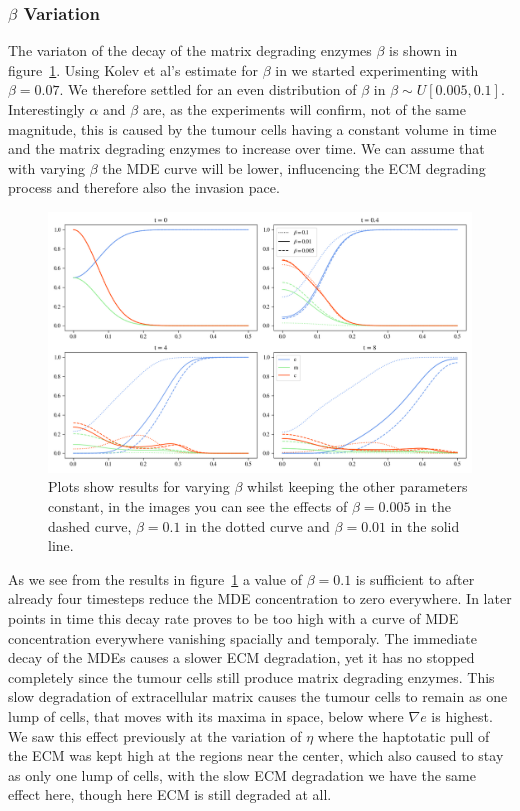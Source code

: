 \subsubsection*{$\beta$ Variation}
The variaton of the decay of the matrix degrading enzymes $\beta$ is shown in figure~\ref{fig:beta_variation}. Using Kolev et al's estimate for $\beta$ in \cite{Kolev2010} we started experimenting with $\beta=0.07$. We therefore settled for an even distribution of $\beta$ in $\beta \sim U[0.005, 0.1]$. Interestingly $\alpha$ and $\beta$ are, as the experiments will confirm, not of the same magnitude, this is caused by the tumour cells having a constant volume in time and the matrix degrading enzymes to increase over time. We can assume that with varying $\beta$ the MDE curve will be lower, influcencing the ECM degrading process and therefore also the invasion pace. \newline 
\begin{figure}[h]
    \centering
    \includegraphics[width=\textwidth]{resources/images/beta_variation.png}
    \caption{Plots show results for varying $\beta$ whilst keeping the other parameters constant, in the images you can see the effects of $\beta=0.005$ in the dashed curve, $\beta=0.1$ in the dotted curve and $\beta=0.01$ in the solid line.}
    \label{fig:beta_variation}
\end{figure}
As we see from the results in figure~\ref{fig:beta_variation} a value of $\beta=0.1$ is sufficient to after already four timesteps reduce the MDE concentration to zero everywhere. In later points in time this decay rate proves to be too high with a curve of MDE concentration everywhere vanishing spacially and temporaly. The immediate decay of the MDEs causes a slower ECM degradation, yet it has no stopped completely since the tumour cells still produce matrix degrading enzymes. This slow degradation of extracellular matrix causes the tumour cells to remain as one lump of cells, that moves with its maxima in space, below where $\nabla e$ is highest. We saw this effect previously at the variation of $\eta$ where the haptotatic pull of the ECM was kept high at the regions near the center, which also caused to stay as only one lump of cells, with the slow ECM degradation we have the same effect here, though here ECM is still degraded at all.\newline
